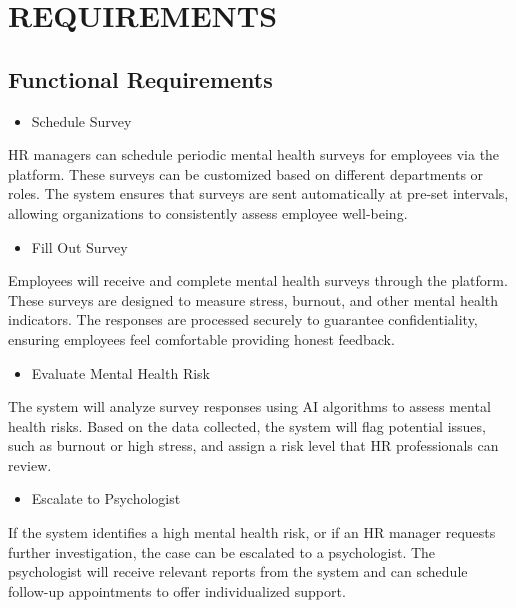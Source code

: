 \documentclass[conference]{IEEEtran}
\begin{document}
\section{REQUIREMENTS}

\subsection{Functional Requirements}

\begin{itemize}
\item Schedule Survey
\end{itemize}

HR managers can schedule periodic mental health surveys
for employees via the platform. These surveys can be
customized based on different departments or roles. The
system ensures that surveys are sent automatically at pre-set
intervals, allowing organizations to consistently assess
employee well-being.
\newline
\begin{itemize}
    \item Fill Out Survey
    \end{itemize}
    
Employees will receive and complete mental health
surveys through the platform. These surveys are designed to
measure stress, burnout, and other mental health indicators.
The responses are processed securely to guarantee
confidentiality, ensuring employees feel comfortable
providing honest feedback.%
\newline

\par
\begin{itemize}
    \item Evaluate Mental Health Risk
    \end{itemize}
    
    The system will analyze survey responses using AI
    algorithms to assess mental health risks. Based on the data
    collected, the system will flag potential issues, such as burnout
    or high stress, and assign a risk level that HR professionals can
    review.
    \newline

\begin{itemize}
        \item Escalate to Psychologist
        \end{itemize}
        
        If the system identifies a high mental health risk, or if an
        HR manager requests further investigation, the case can be
        escalated to a psychologist. The psychologist will receive
        relevant reports from the system and can schedule follow-up
        appointments to offer individualized support.
        \newline
\end{document}
